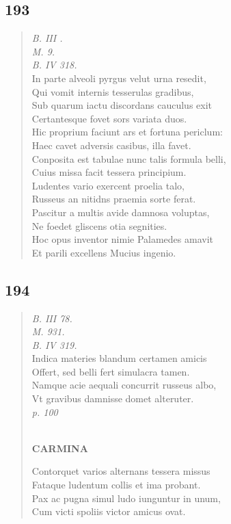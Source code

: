 \documentclass[11pt, a4paper]{report}
\begin{document}
            \subsection*{193}
      \begin{verse}
      \textit{B. III .} \\ \textit{M. 9.} \\ \textit{B. IV 318.} \\ In parte alveoli pyrgus velut urna resedit, \\ Qui vomit internis tesserulas gradibus, \\ Sub quarum iactu discordans cauculus exit \\ Certantesque fovet sors variata duos. \\ Hic proprium faciunt  \lbrack ars \rbrack  et fortuna periclum: \\ Haec cavet adversis casibus, illa favet. \\ Conposita est tabulae nunc talis formula belli, \\ Cuius missa facit tessera principium. \\ Ludentes vario exercent proelia talo, \\ Russeus an nitidns praemia sorte ferat. \\ Pascitur a multis avide damnosa voluptas, \\ Ne foedet gliscens otia segnities. \\ Hoc opus inventor nimie Palamedes amavit \\ Et parili excellens Mucius ingenio. \\ 
      \end{verse}
  
            \subsection*{194}
      \begin{verse}
      \textit{B. III 78.} \\ \textit{M. 931.} \\ \textit{B. IV 319.} \\ Indica materies blandum certamen amicis \\ Offert, sed belli fert simulacra tamen. \\ Namque acie aequali concurrit russeus albo, \\ Vt gravibus damnisse domet alteruter. \\ \textit{p. 100} \\ 
        ﻿\pagebreak 
    \begin{center} \textbf{CARMINA} \end{center} \marginpar{[160]} Contorquet varios alternans tessera missus \\ Fataque ludentum collis et ima probant. \\ Pax ac pugna simul ludo iunguntur in unum, \\ Cum victi spoliis victor amicus ovat. \\ 
      \end{verse}
  
\end{document}
